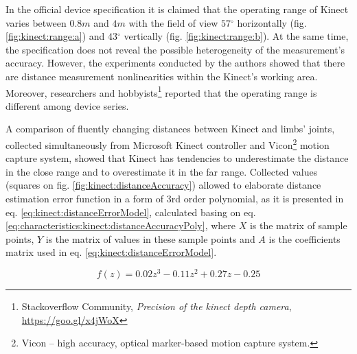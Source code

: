 \documentclass[sensors,article,submit,moreauthors,pdftex,10pt,a4paper]{mdpi}
\newcommand{\degree}{\ensuremath{{}^{\circ}}\xspace}
\begin{document}
In the official device specification it is claimed that the operating range of Kinect varies between $0.8m$ and $4m$ with the field of view $57\degree$ horizontally (fig. \ref{fig:kinect:range:a}) and $43\degree$ vertically (fig. \ref{fig:kinect:range:b}). At the same time, the specification does not reveal the possible heterogeneity of the measurement's accuracy. However, the experiments conducted by the authors showed that there are distance measurement nonlinearities within the Kinect’s working area. Moreover, researchers \cite{DiFilippo2015} and hobbyists\footnote{Stackoverflow Community, \textit{Precision of the kinect depth camera}, \url{https://goo.gl/x4jWoX}} reported that the operating range is different among device series.  

A comparison of fluently changing distances between Kinect and limbs' joints, collected simultaneously from Microsoft Kinect controller and Vicon\footnote{Vicon -- high accuracy, optical marker-based motion capture system.} motion capture system, showed that Kinect has tendencies to underestimate the distance in the close range and to overestimate it in the far range. Collected values (squares on fig. \ref{fig:kinect:distanceAccuracy}) allowed to elaborate distance estimation error function in a form of 3rd order polynomial, as it is presented in eq. \ref{eq:kinect:distanceErrorModel}, calculated basing on eq. \ref{eq:characteristics:kinect:distanceAccuracyPoly}, where $X$ is the matrix of sample points, $Y$ is the matrix of values in these sample points and $A$ is the coefficients matrix used in eq. \ref{eq:kinect:distanceErrorModel}. 

\begin{equation}
	f(z)=0.02z^3-0.11z^2+0.27z-0.25 
	\label{eq:kinect:distanceErrorModel}
\end{equation}
\end{document}

